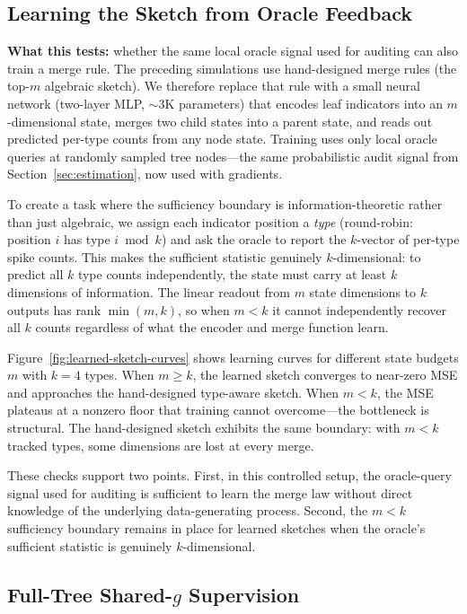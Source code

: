 \subsection{Learning the Sketch from Oracle Feedback}\label{sec:learned-sketch}

\textbf{What this tests:} whether the same local oracle signal used for auditing can also train a merge rule. The preceding simulations use hand-designed merge rules (the top-$m$ algebraic sketch). We therefore replace that rule with a small neural network (two-layer MLP, ${\sim}\!3$K parameters) that encodes leaf indicators into an $m$-dimensional state, merges two child states into a parent state, and reads out predicted per-type counts from any node state. Training uses only local oracle queries at randomly sampled tree nodes---the same probabilistic audit signal from Section~\ref{sec:estimation}, now used with gradients.

To create a task where the sufficiency boundary is information-theoretic rather than just algebraic, we assign each indicator position a \emph{type} (round-robin: position $i$ has type $i \bmod k$) and ask the oracle to report the $k$-vector of per-type spike counts. This makes the sufficient statistic genuinely $k$-dimensional: to predict all $k$ type counts independently, the state must carry at least $k$ dimensions of information. The linear readout from $m$ state dimensions to $k$ outputs has rank $\min(m, k)$, so when $m < k$ it cannot independently recover all $k$ counts regardless of what the encoder and merge function learn.

Figure~\ref{fig:learned-sketch-curves} shows learning curves for different state budgets $m$ with $k=4$ types. When $m \ge k$, the learned sketch converges to near-zero MSE and approaches the hand-designed type-aware sketch. When $m < k$, the MSE plateaus at a nonzero floor that training cannot overcome---the bottleneck is structural. The hand-designed sketch exhibits the same boundary: with $m < k$ tracked types, some dimensions are lost at every merge.

These checks support two points. First, in this controlled setup, the oracle-query signal used for auditing is sufficient to learn the merge law without direct knowledge of the underlying data-generating process. Second, the $m < k$ sufficiency boundary remains in place for learned sketches when the oracle's sufficient statistic is genuinely $k$-dimensional.

\subsection{Full-Tree Shared-$g$ Supervision}

